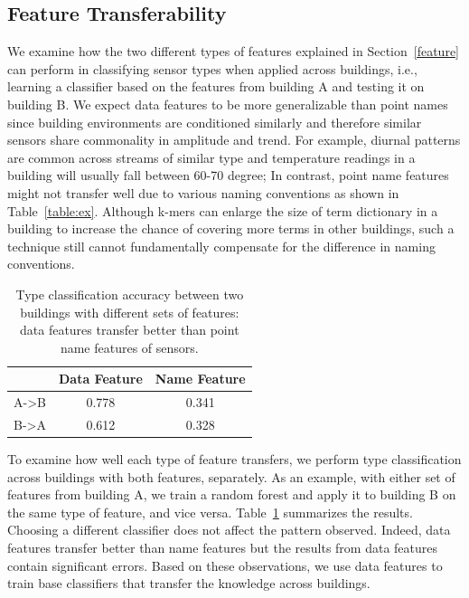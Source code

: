 \subsection{Feature Transferability}
We examine how the two different types of features explained in Section~\ref{feature} can perform in classifying sensor types when applied across buildings, i.e., learning a classifier based on the features from building A and testing it on building B. 
We expect data features to be more generalizable than point names since 
building environments are conditioned similarly and therefore similar sensors 
share commonality in amplitude and trend.
For example, diurnal patterns are common across streams of similar type and 
temperature readings in a building will usually fall between 60-70 degree; 
In contrast, point name features might not transfer well due to various naming conventions as shown in Table~\ref{table:ex}.
Although k-mers can enlarge the size of term dictionary in a building to increase the chance of covering more terms in other buildings, such a technique still cannot fundamentally compensate for the difference in naming conventions.


\begin{table}[h]
\centering
\begin{tabular}{l|c|c}
\hline
                & Data Feature & Name Feature \\ \hline
A-\textgreater B & 0.778       & 0.341       \\
B-\textgreater A & 0.612       & 0.328       \\ \hline
\end{tabular}
\caption{Type classification accuracy between two buildings with different sets of features: data features transfer better than point name features of sensors.}
\label{table:clf}
\end{table}


To examine how well each type of feature transfers, we perform type classification across buildings with both features, separately.   
As an example, with either set of features from building A, we train a random forest and apply it to building B on the same type of feature, and vice versa. 
Table~\ref{table:clf} summarizes the results. Choosing a different classifier does not affect the pattern observed.
Indeed, data features transfer better than name features but the results from data features contain significant errors. 
Based on these observations, we use data features to train base classifiers that transfer the knowledge across buildings.


